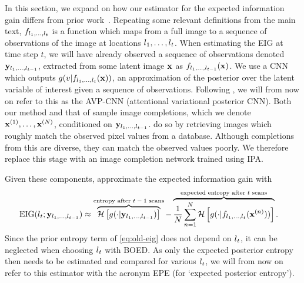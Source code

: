 In this section, we expand on how our estimator for the expected information
gain differs from prior work~\citep{harvey2019near}. Repeating some relevant
definitions from the main text, $f_{l{}_1,\ldots,l{}_t}$ is a function which maps
from a full image to a sequence of observations of the image at locations
$l{}_1,\ldots,l{}_t$. When estimating the EIG at time step $t$, we will have already
observed a sequence of observations denoted ${\mathbf{y}}_{l{}_1,\ldots,l{}_{t-1}}$,
extracted from some latent image ${\mathbf{x}}$ as $f_{l{}_1,\ldots,l{}_{t-1}}({\mathbf{x}})$. We
use a CNN which outputs $g(v|f_{l{}_1,\ldots,l{}_t}({\mathbf{x}}))$, an approximation of the
posterior over the latent variable of interest given a sequence of observations.
Following \citet{harvey2019near}, we will from now on refer to this as the
AVP-CNN (attentional variational posterior CNN).
%
Both our method and that of \citet{harvey2019near} sample image completions,
which we denote ${\mathbf{x}}^{(1)},\ldots,{\mathbf{x}}^{(N)}$, conditioned on
${\mathbf{y}}_{l{}_1,\ldots,l{}_{t-1}}$. \citet{harvey2019near} do so by retrieving
images which roughly match the observed pixel values from a database. Although
completions from this are diverse, they can match the observed values poorly. We
therefore replace this stage with an image completion network trained using
IPA.

Given these components, \citet{harvey2019near} approximate the expected
information gain with
\begin{align}
  \label{eq:old-eig}
  \text{EIG}(l{}_t; {\mathbf{y}}_{l{}_1,\ldots,l{}_{t-1}}) &\approx \overbrace{\mathcal{H} \left[ g(\cdot|{\mathbf{y}}_{l{}_{1},\ldots,l{}_{t-1}}) \right]}^{\text{entropy after $t-1$ scans}} - \overbrace{\frac{1}{N} \sum_{n=1}^N  \mathcal{H} \left[ g(\cdot|f_{l{}_1,\ldots,l{}_t}({\mathbf{x}}^{(n)})) \right]}^{\text{expected entropy after $t$ scans}}.
\end{align}
Since the prior entropy term of \cref{eq:old-eig} does not depend on $l{}_t$, it
can be neglected when choosing $l{}_t$ with BOED. As only the expected posterior
entropy then needs to be estimated and compared for various $l{}_t$, we will from
now on refer to this estimator with the acronym EPE (for `expected posterior
entropy').

